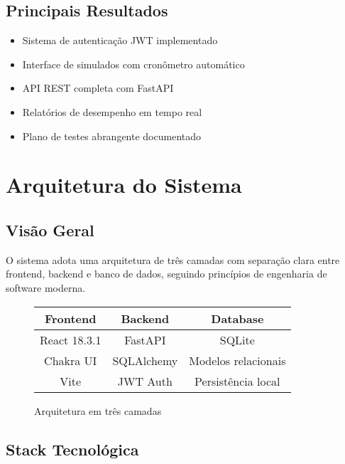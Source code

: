 \documentclass[12pt,a4paper]{article}
\begin{document}
\subsection{Principais Resultados}
\begin{itemize}
    \item Sistema de autenticação JWT implementado
    \item Interface de simulados com cronômetro automático
    \item API REST completa com FastAPI
    \item Relatórios de desempenho em tempo real
    \item Plano de testes abrangente documentado
\end{itemize}

\section{Arquitetura do Sistema}

\subsection{Visão Geral}
O sistema adota uma arquitetura de três camadas com separação clara entre frontend, backend e banco de dados, seguindo princípios de engenharia de software moderna.

\begin{figure}[H]
    \centering
    \begin{tabular}{|c|c|c|}
        \hline
        \textbf{Frontend} & \textbf{Backend} & \textbf{Database} \\
        \hline
        React 18.3.1 & FastAPI & SQLite \\
        Chakra UI & SQLAlchemy & Modelos relacionais \\
        Vite & JWT Auth & Persistência local \\
        \hline
    \end{tabular}
    \caption{Arquitetura em três camadas}
\end{figure}

\subsection{Stack Tecnológica}
\end{document}
